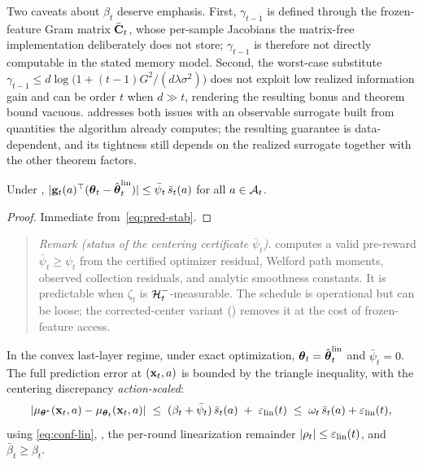 \begin{remark}
Two caveats about $\beta_t$ deserve emphasis.
First, $\gamma_{t-1}$ is defined through the frozen-feature Gram
matrix $\bar{\mathbf{C}}_t$, whose per-sample Jacobians the matrix-free
implementation deliberately does not store; $\gamma_{t-1}$ is
therefore not directly computable in the stated memory model.
Second, the worst-case substitute
$\gamma_{t-1}\le d\log\bigl(1+(t-1)G^2/(d\lambda\sigma^2)\bigr)$
does not exploit low realized information gain and can be order $t$ when
$d\gg t$, rendering the resulting bonus and theorem bound vacuous.
 addresses both issues with an observable surrogate
built from quantities the algorithm already computes; the resulting
guarantee is data-dependent, and its tightness still depends on the realized
surrogate together with the other theorem factors.
\end{remark}

\begin{lemma}\label{lem:discrepancy}
Under ,
$|\mathbf{g}_t(a)^\top(\boldsymbol{\theta}_t - \hat{\boldsymbol{\theta}}_t^{\mathrm{lin}})|\le
\bar\psi_t\,\bar s_t(a)$
for all $a\in\mathcal{A}_t$.
\end{lemma}
\begin{proof}
Immediate from~\eqref{eq:pred-stab}.
\end{proof}

\begin{quote}
\emph{Remark (status of the centering certificate $\bar\psi_t$).}
 computes a valid pre-reward
$\bar\psi_t\ge\psi_t$ from the certified optimizer residual, Welford path
moments, observed collection residuals, and analytic smoothness constants.
It is predictable when $\zeta_t$ is $\mathcal{H}_t^-$-measurable.
The schedule is operational but can be loose; the corrected-center variant
() removes it at the cost of frozen-feature access.
\end{quote}
In the convex last-layer regime, under exact optimization,
$\boldsymbol{\theta}_t = \hat{\boldsymbol{\theta}}_t^{\mathrm{lin}}$ and $\bar\psi_t=0$.
The full prediction error at $(\mathbf{x}_t,a)$ is bounded by the triangle
inequality, with the centering discrepancy \emph{action-scaled}:
\begin{equation}\label{eq:pred-error}
  |\mu_{\boldsymbol{\theta}^*}(\mathbf{x}_t,a) - \mu_{\boldsymbol{\theta}_t}(\mathbf{x}_t,a)|
  \;\le\;
  (\beta_t+\bar\psi_t)\,\bar s_t(a)
  \;+\;
  \varepsilon_{\mathrm{lin}}(t)
  \;\le\;
  \omega_t\,\bar s_t(a)+\varepsilon_{\mathrm{lin}}(t),
\end{equation}
using \eqref{eq:conf-lin}, , the per-round
linearization remainder $|\rho_t|\le\varepsilon_{\mathrm{lin}}(t)$, and $\bar\beta_t\ge\beta_t$.



